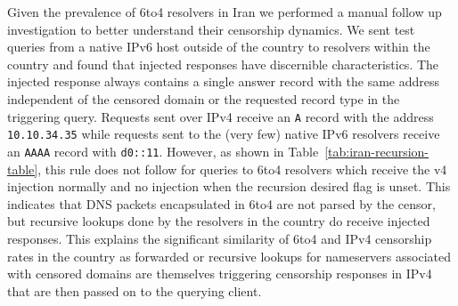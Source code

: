 Given the prevalence of 6to4 resolvers in Iran we performed a manual follow up
investigation to better understand their censorship dynamics. We sent test
queries from a native IPv6 host outside of the country to resolvers within the
country and found that injected responses have discernible characteristics. The
injected response always contains a single answer record with the same address
independent of the censored domain or the requested record type in the
triggering query. Requests sent over IPv4 receive an \texttt{A} record with the
address \texttt{10.10.34.35} while requests sent to the (very few) native IPv6
resolvers receive an \texttt{AAAA} record with \texttt{d0::11}. However, as
shown in Table~\ref{tab:iran-recursion-table}, this rule does not follow for
queries to 6to4 resolvers which receive the v4 injection normally and no
injection when the recursion desired flag is unset. This indicates that DNS
packets encapsulated in 6to4 are not parsed by the censor, but recursive lookups
done by the resolvers in the country do receive injected responses. This
explains the significant similarity of 6to4 and IPv4 censorship rates in the
country as forwarded or recursive lookups for nameservers associated with
censored domains are themselves triggering censorship responses in IPv4 that are
then passed on to the querying client.


